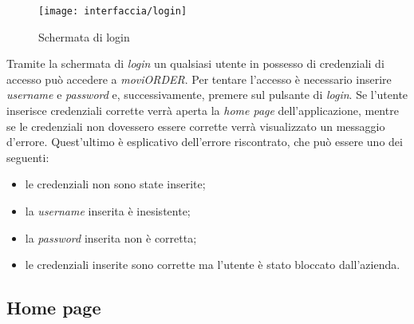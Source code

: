 \begin{figure}[!h] 
    \centering 
    \texttt{[image: interfaccia/login]} 
    \caption{Schermata di login}
\end{figure}

Tramite la schermata di \textit{login} un qualsiasi utente in possesso di credenziali di accesso può accedere a \textit{moviORDER}. Per tentare l'accesso è necessario inserire \textit{username} e \textit{password} e, successivamente, premere sul pulsante di \textit{login}. Se l'utente inserisce credenziali corrette verrà aperta la \textit{home page} dell'applicazione, mentre se le credenziali non dovessero essere corrette verrà visualizzato un messaggio d'errore. Quest'ultimo è esplicativo dell'errore riscontrato, che può essere uno dei seguenti:
\begin{itemize}
	\item le credenziali non sono state inserite;
	\item la \textit{username} inserita è inesistente;
	\item la \textit{password} inserita non è corretta;
	\item le credenziali inserite sono corrette ma l'utente è stato bloccato dall'azienda.
\end{itemize}

\subsection{Home page}

